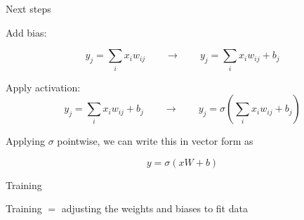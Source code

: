 \begin{frame}{Next steps}

    Add bias:

    \begin{equation*}
        y_j = \sum_i x_i w_{ij}       
        \qquad \to \qquad
        y_j = \sum_i x_i w_{ij} + b_j
    \end{equation*}

    Apply activation:
    \begin{equation*}
        y_j = \sum_i x_i w_{ij} + b_j
        \qquad \to \qquad
        y_j = \sigma \left(\sum_i x_i w_{ij} + b_j \right)
    \end{equation*}

    Applying $\sigma$ pointwise, we can write this in vector form as
    
    \begin{equation*}
        y = \sigma(x W + b)
    \end{equation*}

    
\end{frame}

%     
%
%

\begin{frame}{Training}
    
    \begin{figure}
       \centering
    \end{figure}

    Training $=$ adjusting the weights and biases to fit data

\end{frame}


